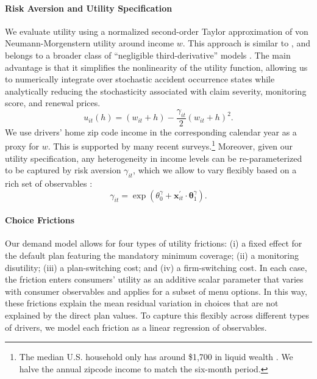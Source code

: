 \paragraph{Risk Aversion and Utility Specification} We evaluate utility using a normalized second-order Taylor approximation of von Neumann-Morgenstern utility around income $w$. This approach is similar to \textcite{Cohen2007}, and belongs to a broader class of ``negligible third-derivative'' models \parencite{barseghyan2018estimating}. The main advantage is that it simplifies the nonlinearity of the utility function, allowing us to numerically integrate over stochastic accident occurrence states while analytically reducing the stochasticity associated with claim severity, monitoring score, and renewal prices.
\begin{equation}
    u_{it}(h) = (w_{it} + h) - \frac{\gamma_{it}}{2} (w_{it} + h)^2.
\end{equation}
%
We use drivers' home zip code income in the corresponding calendar year as a proxy for $w$. This is supported by many recent surveys.\footnote{The median U.S. household only has around \$1,700 in liquid wealth \parencite{kaplan2014wealthy}. We halve the annual zipcode income to match the six-month period.} Moreover, given our utility specification, any heterogeneity in income levels can be re-parameterized to be captured by risk aversion $\gamma_{it}$, which we allow to vary flexibly based on a rich set of observables \parencite{jeziorski2014adverse}:
\begin{equation}
    \gamma_{it} = \exp( \theta^{\gamma}_0 + \mathbf{x}_{it}^\prime \cdot \mathbf{\theta}^{\gamma}_{1}).
\end{equation}
%
\paragraph{Choice Frictions} Our demand model allows for four types of utility frictions: (i) a fixed effect for the default plan featuring the mandatory minimum coverage; (ii) a monitoring disutility; (iii) a plan-switching cost; and (iv) a firm-switching cost.  In each case, the friction enters consumers' utility as an additive scalar parameter that varies with consumer observables and applies for a subset of menu options. In this way, these frictions explain the mean residual variation in choices that are not explained by the direct plan values.
To capture this flexibly across different types of drivers, we model each friction as a linear regression of observables.

